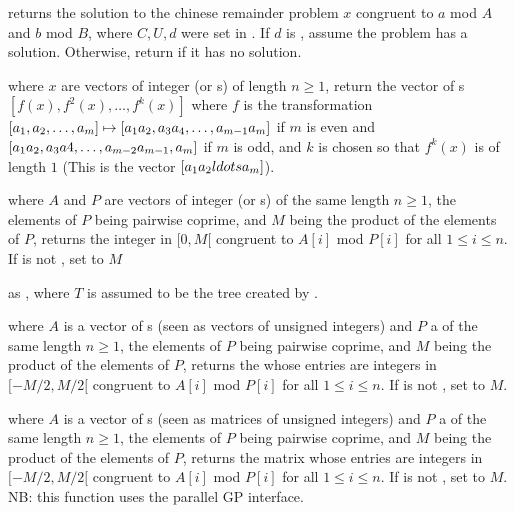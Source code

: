 returns
the solution to the chinese remainder problem $x$ congruent
to $a$ mod $A$ and $b$ mod $B$, where $C, U, d$ were set in
. If $d$ is , assume the problem has a
solution. Otherwise, return  if it has no solution.

\medskip

 where $x$ are vectors of integer (or
s) of length $n\ge 1$, return the vector of s
$[f(x),f^2(x),\ldots,f^k(x)]$ where $f$ is the transformation
$[a_1,a_2,\ldots,a_m] \mapsto [a_1\*a_2,a_3\*a_4,\ldots,a_{m-1}\*a_m]$ if $m$
is even and $[a_1\*a_2,a_3\*a4,\ldots,a_{m-2}\*a_{m-1},a_m]$ if $m$ is odd,
and $k$ is chosen so that $f^k(x)$ is of length $1$ (This is the vector
$[a_1\*a_2\*ldots\*a_m]$).

where $A$ and $P$ are vectors of integer (or s) of the same
length $n\ge 1$, the elements of $P$ being pairwise coprime, and $M$ being the
product of the elements of $P$, returns the integer in $[0, M[$ congruent to
$A[i]$ mod $P[i]$ for all $1\leq i\leq n$.  If  is not ,
set  to $M$

as , where $T$ is assumed to be the tree created by
.

where $A$ is a vector of s (seen as vectors of unsigned integers)
and $P$ a  of the same length $n\ge 1$, the elements of $P$
being pairwise coprime, and $M$ being the product of the elements of $P$,
returns the  whose entries are integers in $[-M/2, M/2[$ congruent to $A[i]$
mod $P[i]$ for all $1\leq i\leq n$.
If  is not , set  to $M$.

where $A$ is a vector of s (seen as matrices of unsigned integers)
 and $P$ a  of the same length $n\ge 1$, the elements of $P$
being pairwise coprime, and $M$ being the product of the elements of $P$,
returns the matrix whose entries are integers in $[-M/2, M/2[$ congruent to $A[i]$
mod $P[i]$ for all $1\leq i\leq n$.
If  is not , set  to $M$.
NB: this function uses the parallel GP interface.

